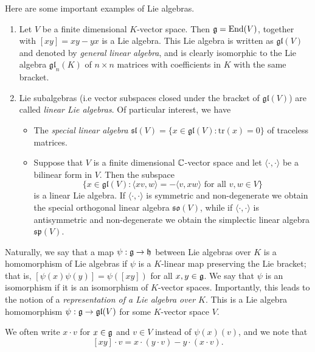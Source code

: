 \begin{example} Here are some important examples of Lie algebras.
    \begin{enumerate}
        \item Let $V$ be a finite dimensional $K$-vector space. Then $\mathfrak{g}=\mathrm{End}(V)$, together with $[xy]=xy-yx$ is a Lie algebra. This Lie algebra is written as $\mathfrak{gl}(V)$ and denoted by \textit{general linear algebra}, and is clearly isomorphic to the Lie algebra $\mathfrak{gl}_n(K)$ of $n\times n$ matrices with coefficients in $K$ with the same bracket.
        \item Lie subalgebras (i.e vector subspaces closed under the bracket of $\mathfrak{gl}(V)$) are called \textit{linear Lie algebras}. Of particular interest, we have
        \begin{itemize}
            \item The \textit{special linear algebra} $\mathfrak{sl}(V)=\{x\in\mathfrak{gl}(V):\mathrm{tr}(x)=0\}$ of traceless matrices.
            \item Suppose that $V$ is a finite dimensional $\mathbb{C}$-vector space and let $\langle\cdot,\cdot\rangle$ be a bilinear form in $V$. Then the subspace $$\{x\in\mathfrak{gl}(V):\langle xv,w\rangle=-\langle v,xw\rangle \text{ for all } v,w\in V\}$$ is a linear Lie algebra. If $\langle\cdot,\cdot\rangle$ is symmetric and non-degenerate we obtain the special orthogonal linear algebra $\mathfrak{so}(V)$, while if $\langle\cdot,\cdot\rangle$ is antisymmetric and non-degenerate we obtain the simplectic linear algebra $\mathfrak{sp}(V)$.
        \end{itemize}
    \end{enumerate}

\end{example}

Naturally, we say that a map $\psi:\mathfrak{g}\rightarrow\mathfrak{h}$ between Lie algebras over $K$ is a homomorphism of Lie algebras if $\psi$ is a $K$-linear map preserving the Lie bracket; that is, $[\psi(x)\psi(y)]=\psi([xy])$ for all $x,y\in\mathfrak{g}$. We say that $\psi$ is an isomorphism if it is an isomorphism of $K$-vector spaces. Importantly, this leads to the notion of a \textit{representation of a Lie algebra over $K$}. This is a Lie algebra homomorphism $\psi:\mathfrak{g}\to\mathfrak{gl}(V)$ for some $K$-vector space $V$. 

We often write $x\cdot v$ for $x\in\mathfrak{g}$ and $v\in V$ instead of $\psi(x)(v)$, and we note that $$[xy]\cdot v=x\cdot(y\cdot v)-y\cdot(x\cdot v).$$

